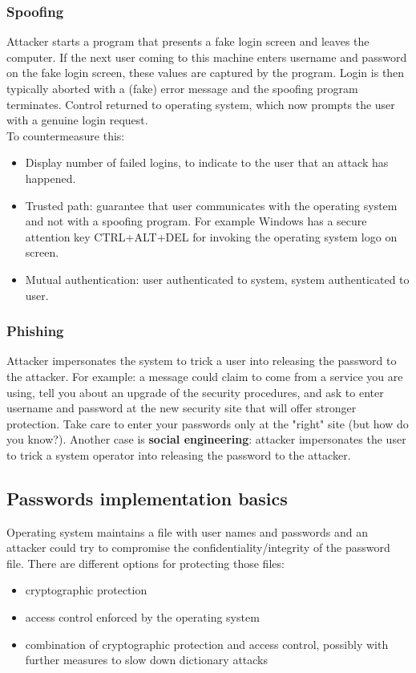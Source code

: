 \documentclass[a4paper, 10pt, titlepage]{article}
\begin{document}
\subsubsection*{Spoofing}
Attacker starts a program that presents a fake login screen and leaves the computer. If the next user coming to this machine enters username and password on the fake login screen, these values are captured by the program. Login is then typically aborted with a (fake) error message and the spoofing program terminates. Control returned to operating system, which now prompts the user with a genuine login request. \medskip \\
To countermeasure this:
\begin{itemize}
\item Display number of failed logins, to indicate to the user that an attack has happened.
\item Trusted path: guarantee that user communicates with the operating system and not with a spoofing program. For example Windows has a secure attention key CTRL+ALT+DEL for invoking the operating system logo on screen.
\item Mutual authentication: user authenticated to system, system authenticated to user.
\end{itemize}

\subsubsection*{Phishing}
Attacker impersonates the system to trick a user into releasing the password to the attacker. For example: a message could claim to come from a service you are using, tell you about an upgrade of the security procedures, and ask to enter username and password at the new security site that will offer stronger protection.
Take care to enter your passwords only at the "right" site (but how do you know?). Another case is \textbf{social engineering}: attacker impersonates the user to trick a system operator into releasing the password to the attacker.

\subsection{Passwords implementation basics}
Operating system maintains a file with user names and passwords and an attacker could try to compromise the confidentiality/integrity of the password file. There are different options for protecting those files:
\begin{itemize}
\item cryptographic protection
\item access control enforced by the operating system
\item combination of cryptographic protection and access control, possibly with further measures to slow down dictionary attacks
\end{itemize}
\end{document}
